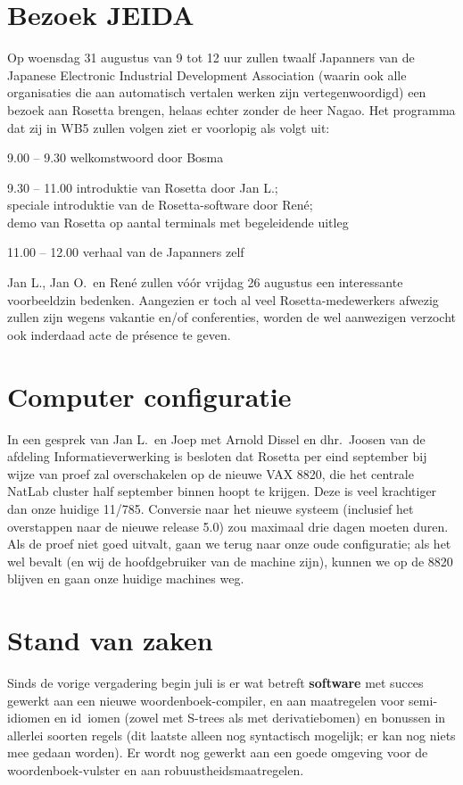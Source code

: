 \section{Bezoek JEIDA}
Op woensdag 31 augustus van 9 tot 12 uur zullen twaalf Japanners van de 
Japanese Electronic Industrial Development Association (waarin ook alle 
organisaties die aan automatisch vertalen werken zijn vertegenwoordigd) een 
bezoek aan Rosetta brengen, helaas echter zonder de heer Nagao. Het programma 
dat zij in WB5 zullen volgen ziet er voorlopig als volgt uit: 
\begin{description}
\item 9.00 -- 9.30 welkomstwoord door Bosma
\item 9.30 -- 11.00 introduktie van Rosetta door Jan L.; \\
      speciale introduktie van de Rosetta-software door Ren\'{e};\\
      demo van Rosetta op aantal terminals met begeleidende uitleg
\item 11.00 -- 12.00 verhaal van de Japanners zelf
\end{description}
Jan L., Jan O.\ en Ren\'{e} zullen v\'{o}\'{o}r vrijdag 26 augustus een 
interessante voorbeeldzin bedenken. Aangezien er toch al veel 
Rosetta-medewerkers afwezig zullen zijn wegens vakantie en/of conferenties, 
worden de 
wel aanwezigen verzocht ook inderdaad acte de pr\'{e}sence te geven.


\section{Computer configuratie}
In een gesprek van Jan L.\ en Joep met Arnold Dissel en dhr.\ Joosen van de 
afdeling Informatieverwerking is besloten dat Rosetta per eind september bij 
wijze van proef zal overschakelen op de nieuwe VAX 8820, die het centrale 
NatLab cluster half september binnen hoopt te krijgen. Deze is veel krachtiger 
dan onze huidige 11/785. Conversie naar het nieuwe systeem (inclusief het 
overstappen naar de nieuwe release 5.0) zou maximaal drie dagen moeten duren.
Als de proef niet goed uitvalt, gaan we terug naar onze oude configuratie; als 
het wel bevalt (en wij de hoofdgebruiker van de machine zijn), kunnen we op 
de 8820 blijven en gaan onze huidige machines weg.


\section{Stand van zaken}
Sinds de vorige vergadering begin juli is er wat betreft {\bf software} met 
succes ge\-werkt aan een nieuwe woordenboek-compiler, en aan maatregelen voor 
semi-idiomen en id~iomen (zowel met S-trees als met derivatiebomen) en bonussen 
in allerlei soorten regels (dit laatste alleen nog syntactisch mogelijk; er kan 
nog niets mee gedaan worden). Er wordt nog gewerkt aan een goede omgeving voor 
de woordenboek-vulster en aan robuustheidsmaatregelen.

